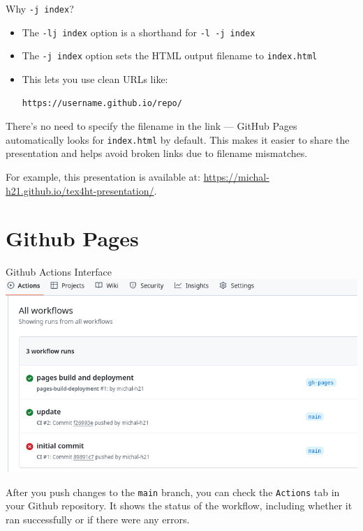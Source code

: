 \begin{frame}[fragile]{Why \texttt{-j index}?}
\begin{itemize}
  \item The \texttt{-lj index} option is a shorthand for \texttt{-l -j index}
  \item The \texttt{-j index} option sets the HTML output filename to \texttt{index.html}
  \item This lets you use clean URLs like:
  
\begin{verbatim}
https://username.github.io/repo/
\end{verbatim}

\end{itemize}
\end{frame}


There’s no need to specify the filename in the link — GitHub Pages
automatically looks for \texttt{index.html} by default. This makes it easier to share
the presentation and helps avoid broken links due to filename mismatches.

For example, this presentation is available at: \url{https://michal-h21.github.io/tex4ht-presentation/}.

\section{Github Pages}

\begin{frame}[fragile]{Github Actions Interface}
  \includegraphics[width=\textwidth]{img/github-actions.png}
\end{frame}

After you push changes to the \texttt{main} branch, you can check the \texttt{Actions} tab in your
Github repository. It shows the status of the workflow, including whether it ran successfully or if there were any errors.



